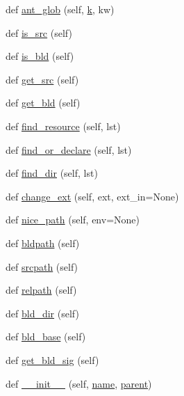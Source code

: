 \begin{DoxyCompactItemize}
def \hyperlink{classwaflib_1_1_node_1_1_node_a5d9b6cac9100b15869f68df28f1d8cb4}{ant\+\_\+glob} (self, \hyperlink{rfft2d_test_m_l_8m_adc468c70fb574ebd07287b38d0d0676d}{k}, kw)
\item 
def \hyperlink{classwaflib_1_1_node_1_1_node_ae47c79cf11fd975ccd2a7316eda8b892}{is\+\_\+src} (self)
\item 
def \hyperlink{classwaflib_1_1_node_1_1_node_ac800b56240d593327ff3f3f17c58313d}{is\+\_\+bld} (self)
\item 
def \hyperlink{classwaflib_1_1_node_1_1_node_a7f7ca00eb49c81382a69e032b5229ea6}{get\+\_\+src} (self)
\item 
def \hyperlink{classwaflib_1_1_node_1_1_node_a181e1ee8473df6b270153d1b071d4dc0}{get\+\_\+bld} (self)
\item 
def \hyperlink{classwaflib_1_1_node_1_1_node_a72b22d40cbdffb458638abb21d706ff8}{find\+\_\+resource} (self, lst)
\item 
def \hyperlink{classwaflib_1_1_node_1_1_node_aca7db00cba3cae363d3b5f689ce10828}{find\+\_\+or\+\_\+declare} (self, lst)
\item 
def \hyperlink{classwaflib_1_1_node_1_1_node_a6b0cb5708818ef6483466202ece39049}{find\+\_\+dir} (self, lst)
\item 
def \hyperlink{classwaflib_1_1_node_1_1_node_ad8e6f438a9b4e34994c8ef82c3b7649d}{change\+\_\+ext} (self, ext, ext\+\_\+in=None)
\item 
def \hyperlink{classwaflib_1_1_node_1_1_node_a84dd8d16929674c2a4dadcc078d9d314}{nice\+\_\+path} (self, env=None)
\item 
def \hyperlink{classwaflib_1_1_node_1_1_node_a1e67abe7b66ef0abd91795547e14a7b7}{bldpath} (self)
\item 
def \hyperlink{classwaflib_1_1_node_1_1_node_a135bd20c340d064fb59d2c8f329fec50}{srcpath} (self)
\item 
def \hyperlink{classwaflib_1_1_node_1_1_node_a4bc57e86dc18da4ce8fc9a669a829186}{relpath} (self)
\item 
def \hyperlink{classwaflib_1_1_node_1_1_node_ae2103a3fade78458d40298173d7179a3}{bld\+\_\+dir} (self)
\item 
def \hyperlink{classwaflib_1_1_node_1_1_node_a56b26245067bfe835f32199e74135a8a}{bld\+\_\+base} (self)
\item 
def \hyperlink{classwaflib_1_1_node_1_1_node_a804270edff72f7bc520841fa60a494e4}{get\+\_\+bld\+\_\+sig} (self)
\item 
def \hyperlink{classwaflib_1_1_node_1_1_node_acf6238a6107f9c667ddd3aee5b30c626}{\+\_\+\+\_\+init\+\_\+\+\_\+} (self, \hyperlink{lib_2expat_8h_a1b49b495b59f9e73205b69ad1a2965b0}{name}, \hyperlink{classwaflib_1_1_node_1_1_node_a2136fddf4c5e98dc8d1661bee03e725c}{parent})

\end{DoxyCompactItemize}
